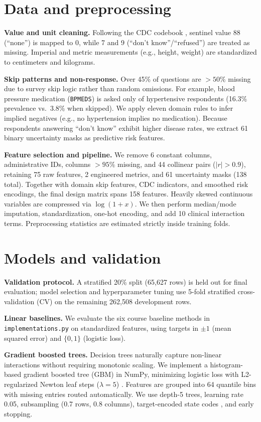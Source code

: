 \documentclass[10pt,conference,compsocconf]{IEEEtran}
\begin{document}
\section{Data and preprocessing}
\label{sec:data}
\textbf{Value and unit cleaning.} Following the CDC codebook \cite{brfss2015codebook}, sentinel value 88 (``none'') is mapped to 0, while 7 and 9 (``don't know''/``refused'') are treated as missing. Imperial and metric measurements (e.g., height, weight) are standardized to centimeters and kilograms.

\textbf{Skip patterns and non-response.} Over 45\% of questions are $>50\%$ missing due to survey skip logic rather than random omissions. For example, blood pressure medication (\texttt{BPMEDS}) is asked only of hypertensive respondents (16.3\% prevalence vs.\ 3.8\% when skipped). We apply eleven domain rules to infer implied negatives (e.g., no hypertension implies no medication). Because respondents answering ``don't know'' exhibit higher disease rates, we extract 61 binary uncertainty masks as predictive risk features.

\textbf{Feature selection and pipeline.} We remove 6 constant columns, administrative IDs, columns $>95\%$ missing, and 44 collinear pairs ($|r|>0.9$), retaining 75 raw features, 2 engineered metrics, and 61 uncertainty masks (138 total). Together with domain skip features, CDC indicators, and smoothed risk encodings, the final design matrix spans 158 features. Heavily skewed continuous variables are compressed via $\log(1+x)$. We then perform median/mode imputation, standardization, one-hot encoding, and add 10 clinical interaction terms. Preprocessing statistics are estimated strictly inside training folds.

\section{Models and validation}
\label{sec:models}
\textbf{Validation protocol.} A stratified 20\% split (65,627 rows) is held out for final evaluation; model selection and hyperparameter tuning use 5-fold stratified cross-validation (CV) on the remaining 262,508 development rows.

\textbf{Linear baselines.} We evaluate the six course baseline methods in \texttt{implementations.py} \cite{cs433} on standardized features, using targets in $\pm1$ (mean squared error) and $\{0,1\}$ (logistic loss).

\textbf{Gradient boosted trees.} Decision trees naturally capture non-linear interactions without requiring monotonic scaling. We implement a histogram-based gradient boosted tree (GBM) \cite{friedman2001greedy} in NumPy, minimizing logistic loss with L2-regularized Newton leaf steps ($\lambda=5$) \cite{chen2016xgboost}. Features are grouped into 64 quantile bins with missing entries routed automatically. We use depth-5 trees, learning rate 0.05, subsampling (0.7 rows, 0.8 columns), target-encoded state codes \cite{miccibarreca2001}, and early stopping.
\end{document}
